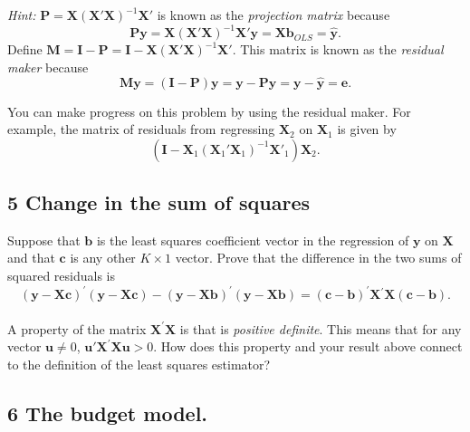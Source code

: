\documentclass[11pt]{article}
\begin{document}
{\footnotesize
\emph{Hint:} $\boldsymbol{P}=\boldsymbol{X}\left(\boldsymbol{X}\boldsymbol{'X}\right)^{-1}\boldsymbol{X}'$
is known as the \emph{projection matrix }because 
\[
\boldsymbol{P}\boldsymbol{y}=\boldsymbol{X}\left(\boldsymbol{X}\boldsymbol{'X}\right)^{-1}\boldsymbol{X}'\boldsymbol{y}=\boldsymbol{X}\boldsymbol{b}_{OLS}=\hat{\boldsymbol{y}}.
\]
Define $\boldsymbol{M}=\boldsymbol{I}-\boldsymbol{P}=\boldsymbol{I}-\boldsymbol{X}\left(\boldsymbol{X}\boldsymbol{'X}\right)^{-1}\boldsymbol{X}'$.
This matrix is known as the \emph{residual maker} because
\[
\boldsymbol{M}\boldsymbol{y}=\left(\boldsymbol{I}-\boldsymbol{P}\right)\boldsymbol{y}=\boldsymbol{y}-\boldsymbol{P}\boldsymbol{y}=\boldsymbol{y}-\hat{\boldsymbol{y}}=\boldsymbol{e}.
\]

You can make progress on this problem by using the residual maker.
For example, the matrix of residuals from regressing $\boldsymbol{X}_{2}$
on $\boldsymbol{X}_{1}$ is given by 
\[
\left(\boldsymbol{I}-\boldsymbol{X}_{1}\left(\boldsymbol{X}_{1}\boldsymbol{'X}_{1}\right)^{-1}\boldsymbol{X}'_{1}\right)\boldsymbol{X}_{2}.
\]
}



\subsection*{5 Change in the sum of squares}
 Suppose that $\boldsymbol{b}$ is the least
squares coefficient vector in the regression of $\boldsymbol{y}$ on $\boldsymbol{X}$ and that
$\boldsymbol{c}$ is any other $K\times1$ vector. Prove that the difference in
the two sums of squared residuals is 
\[
(\boldsymbol{y}-\boldsymbol{X} \boldsymbol{c})^{\prime}(\boldsymbol{y}-\boldsymbol{X} \boldsymbol{c})-
(\boldsymbol{y}-\boldsymbol{X} \boldsymbol{b})^{\prime}(\boldsymbol{y}-\boldsymbol{X} \boldsymbol{b})=
(\boldsymbol{c}-\boldsymbol{b})^{\prime} \boldsymbol{X}{}^{\prime} \boldsymbol{X}(\boldsymbol{c}-\boldsymbol{b}).
\]
\\
A property of the matrix $\boldsymbol{X}^{\prime} \boldsymbol{X}$ is that is \emph{positive
definite}. This means that for any vector $\boldsymbol{u} \ne0$, $\boldsymbol{u}'\boldsymbol{X}^{\prime}\boldsymbol{X} \boldsymbol{u}>0$.
How does this property and your result above connect to the definition
of the least squares estimator? 


\subsection*{6 The budget model.} 
\end{document}

